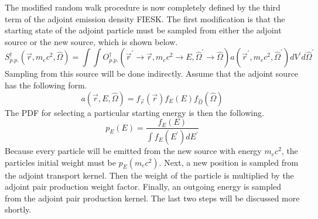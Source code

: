 The modified random walk procedure is now completely defined by the third
term of the adjoint emission density FIESK. The first modification is that 
the starting state of the adjoint particle must be sampled from either the 
adjoint source or the new source, which is shown below.
\begin{equation}
  S_{p.p.}^{\dagger}(\vec{r},m_ec^2,\hat{\Omega}) =
  \int\int O_{p.p.}^{\dagger}(\vec{r}^{'} \to \vec{r}, m_ec^2 \to E, \hat{\Omega}^{'}
  \to \hat{\Omega}) a(\vec{r}^{'},m_ec^2,\hat{\Omega}^{'}) 
  dV^{'}d\hat{\Omega}^{'}
\end{equation}
Sampling from this source will be done indirectly. Assume that the adjoint
source has the following form.
\begin{equation*}
  a(\vec{r},E,\hat{\Omega}) = f_{\vec{r}}(\vec{r})f_E(E)
  f_{\hat{\Omega}}(\hat{\Omega})
 \end{equation*}
The PDF for selecting a particular starting energy is then the following.
\begin{equation*}
  p_E(E) = \frac{f_E(E)}{\int f_E(E^{'})dE^{'}}
\end{equation*}
Because every particle will be emitted from the new source with energy
$m_ec^2$, the particles initial weight must be $p_E(m_ec^2)$. Next, a new
position is sampled from the adjoint transport kernel. Then the weight of the 
particle is multiplied by the adjoint pair production weight factor. Finally, 
an outgoing energy is sampled from the adjoint pair production kernel. The
last two steps will be discussed more shortly.

